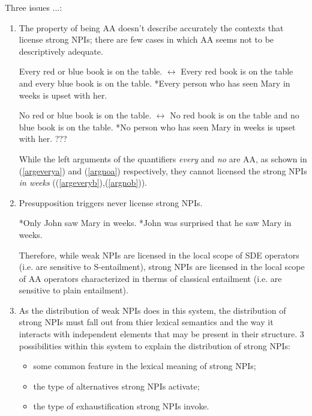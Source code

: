 \documentclass[a4paper,11pt]{article}
\newcommand{\reff}[1]{(\ref{#1})}
\begin{document}
Three issues ...:
\begin{enumerate}
\item The property of being AA doesn't describe accurately the contexts that license strong NPIs; there are few cases in which AA seems not to be descriptively adequate.
\begin{exe}
\ex\label{everyno} \begin{xlist}
\ex\label{argevery} \begin{xlist}
\ex\label{argeverya} Every red or blue book is on the table. $\leftrightarrow$ Every red book is on the table and every blue book is on the table.
\ex\label{argeveryb} *Every person who has seen Mary in weeks is upset with her.
\end{xlist}
\ex\label{argno} \begin{xlist}
\ex\label{argnoa} No red or blue book is on the table. $\leftrightarrow$ No red book is on the table and no blue book is on the table.
\ex\label{argnob} *No person who has seen Mary in weeks is upset with her. ??? 
\end{xlist}
\end{xlist}
\end{exe}
While the left arguments of the quantifiers \textit{every} and \textit{no} are AA, as schown in \reff{argeverya} and \reff{argnoa} respectively, they cannot licensed the strong NPIs \textit{in weeks} (\reff{argeveryb},\reff{argnob}).
\item Presupposition triggers never license strong NPIs.
\begin{exe}
\ex\label{presuptrig} \begin{xlist}
\ex\label{presuptriga} *Only John saw Mary in weeks. 
\ex\label{presuptrigb} *John was surprised that he saw Mary in weeks.
\end{xlist}
\end{exe}
Therefore, while weak NPIs are licensed in the local scope of SDE operators (i.e. are sensitive to S-entailment), strong NPIs are licensed in the local scope of AA operators 
characterized in therms of classical entailment (i.e. are sensitive to plain entailment).
\item As the distribution of weak NPIs does in this system, the distribution of strong NPIs must fall out from thier lexical semantics and the way it interacts with independent elements that may be present in their structure. 3 possibilities within this system to explain the distribution of strong NPIs:
\begin{itemize}
\item some common feature in the lexical meaning of strong NPIs;
\item the type of alternatives strong NPIs activate;
\item the type of exhaustification strong NPIs invoke.
\end{itemize}
\end{enumerate}
\end{document}
